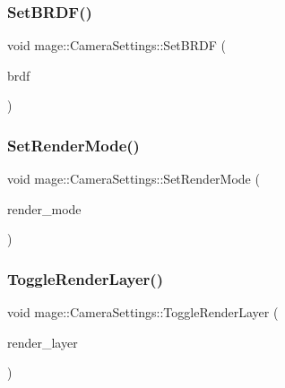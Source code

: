 \subsubsection{\texorpdfstring{Set\+B\+R\+D\+F()}{SetBRDF()}}
{\footnotesize\ttfamily void mage\+::\+Camera\+Settings\+::\+Set\+B\+R\+DF (\begin{DoxyParamCaption}\item[{\hyperlink{namespacemage_ae7a7a03a7b34d7e2689689bb8295cd38}{B\+R\+D\+F\+Type}}]{brdf }\end{DoxyParamCaption})\hspace{0.3cm}{\ttfamily [noexcept]}}

\hypertarget{structmage_1_1_camera_settings_ab0d6720a08e88e018c2a2e6097933d98}{}\label{structmage_1_1_camera_settings_ab0d6720a08e88e018c2a2e6097933d98} 
\subsubsection{\texorpdfstring{Set\+Render\+Mode()}{SetRenderMode()}}
{\footnotesize\ttfamily void mage\+::\+Camera\+Settings\+::\+Set\+Render\+Mode (\begin{DoxyParamCaption}\item[{\hyperlink{namespacemage_a5e7e18b0154373ce8fc942fe3f6b27fd}{Render\+Mode}}]{render\+\_\+mode }\end{DoxyParamCaption})\hspace{0.3cm}{\ttfamily [noexcept]}}

\hypertarget{structmage_1_1_camera_settings_a47c34af7eddc2a0f6256d137b5813a4c}{}\label{structmage_1_1_camera_settings_a47c34af7eddc2a0f6256d137b5813a4c} 
\subsubsection{\texorpdfstring{Toggle\+Render\+Layer()}{ToggleRenderLayer()}}
{\footnotesize\ttfamily void mage\+::\+Camera\+Settings\+::\+Toggle\+Render\+Layer (\begin{DoxyParamCaption}\item[{\hyperlink{namespacemage_a8b4a82582105b0299e2c2be5af7255d6}{Render\+Layer}}]{render\+\_\+layer }\end{DoxyParamCaption})\hspace{0.3cm}{\ttfamily [noexcept]}}



